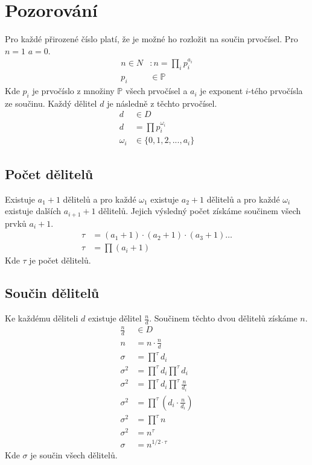 \documentclass{MO}
\author{Dominik Dembinný}
\begin{document}
\makeMOheader

\section*{Pozorování}

Pro každé přirozené číslo platí, že je možné ho rozložit na součin prvočísel. Pro $n = 1$ $a = 0$.
\begin{align*}
    n \in N &: n = \prod_{i} p_i^{a_i} \\
    p_i &\in \mathbb{P}
\end{align*}
Kde $p_i$ je prvočíslo z množiny $\mathbb{P}$ všech prvočísel a $a_i$ je exponent $i$-tého prvočísla ze součinu.
Každý dělitel $d$ je následně  z těchto prvočísel.
\begin{align*}
    d &\in D \\
    d &= \prod p_i^{\omega_i} \\
    \omega_i &\in \{0, 1, 2, ..., a_i\}
\end{align*}

\subsection*{Počet dělitelů}
Existuje $a_1 + 1$ dělitelů a
pro každé $\omega_1$ existuje $a_2 + 1$ dělitelů a
pro každé $\omega_i$ existuje dalších $a_{i + 1} + 1$ dělitelů.
Jejich výsledný počet získáme součinem všech prvků $a_i + 1$.
\begin{align*}
    \tau &= (a_1 + 1) \cdot (a_2 + 1) \cdot (a_3 + 1) \dots \\
    \tau &= \prod (a_i + 1)
\end{align*}
Kde $\tau$ je počet dělitelů.

\subsection*{Součin dělitelů}
Ke každému děliteli $d$ existuje dělitel $\frac{n}{d}$.
Součinem těchto dvou dělitelů získáme $n$.
\begin{align*}
    \frac{n}{d} &\in D \\
    n &= n \cdot \frac{n}{d} \\
    \sigma &= \prod^{\tau} d_i \\
    \sigma^2 &= \prod^{\tau} d_i \prod^{\tau} d_i \\
    \sigma^2 &= \prod^{\tau} d_i \prod^{\tau} \frac{n}{d_i} \\
    \sigma^2 &= \prod^{\tau} (d_i \cdot \frac{n}{d_i}) \\
    \sigma^2 &= \prod^{\tau} n \\
    \sigma^2 &= n^{\tau} \\
    \sigma &= n^{1/2 \cdot \tau}
\end{align*}
Kde $\sigma$ je součin všech dělitelů.
\end{document}
